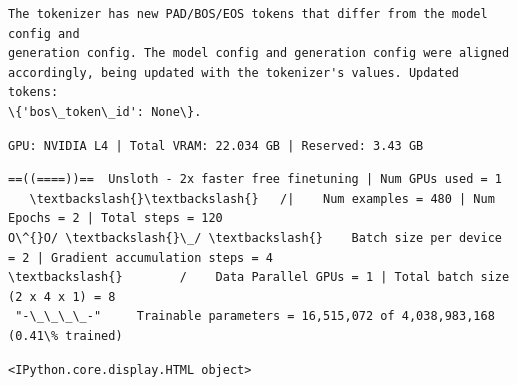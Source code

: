 \documentclass[11pt]{article}
\begin{document}
    \begin{Verbatim}[commandchars=\\\{\}]
The tokenizer has new PAD/BOS/EOS tokens that differ from the model config and
generation config. The model config and generation config were aligned
accordingly, being updated with the tokenizer's values. Updated tokens:
\{'bos\_token\_id': None\}.
    \end{Verbatim}

    \begin{Verbatim}[commandchars=\\\{\}]
GPU: NVIDIA L4 | Total VRAM: 22.034 GB | Reserved: 3.43 GB
    \end{Verbatim}

    \begin{Verbatim}[commandchars=\\\{\}]
==((====))==  Unsloth - 2x faster free finetuning | Num GPUs used = 1
   \textbackslash{}\textbackslash{}   /|    Num examples = 480 | Num Epochs = 2 | Total steps = 120
O\^{}O/ \textbackslash{}\_/ \textbackslash{}    Batch size per device = 2 | Gradient accumulation steps = 4
\textbackslash{}        /    Data Parallel GPUs = 1 | Total batch size (2 x 4 x 1) = 8
 "-\_\_\_\_-"     Trainable parameters = 16,515,072 of 4,038,983,168 (0.41\% trained)
    \end{Verbatim}

    
    \begin{Verbatim}[commandchars=\\\{\}]
<IPython.core.display.HTML object>
    \end{Verbatim}
\end{document}
